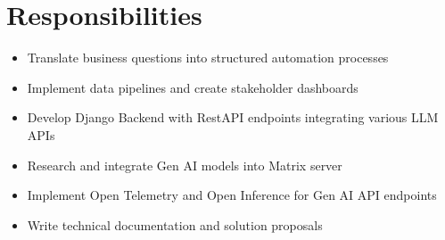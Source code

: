 \documentclass[11pt,a4paper]{article}
\newcommand{\resumeItem}[1]{\item #1}
\begin{document}
\section{Responsibilities}
\begin{itemize}[leftmargin=*]
    \resumeItem{Translate business questions into structured automation processes}
    \resumeItem{Implement data pipelines and create stakeholder dashboards}
    \resumeItem{Develop Django Backend with RestAPI endpoints integrating various LLM APIs}
    \resumeItem{Research and integrate Gen AI models into Matrix server}
    \resumeItem{Implement Open Telemetry and Open Inference for Gen AI API endpoints}
    \resumeItem{Write technical documentation and solution proposals}
\end{itemize}
\end{document}
